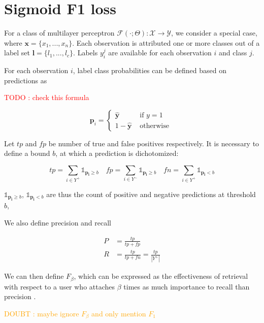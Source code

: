 \documentclass[sigconf,natbib,screen=true,review=true,anonymous]{acmart}
\newcommand\todo[1]{\textcolor{red}{TODO : #1}}
\newcommand\doubt[1]{\textcolor{orange}{DOUBT : #1}}
\begin{document}
\section{Sigmoid F1 loss}
\label{sec:orgcf3a92b}

For a class of multilayer perceptron \(\mathcal{F}(\cdot ; \Theta): \mathcal{X} \rightarrow \mathcal{Y}\), we consider a special case, where \(\mathbf{x} = \{x_1, ..., x_n\}\). Each observation is attributed one or more classes out of a label set \(\mathbf{l} = \{l_1, ..., l_c\}\). Labels \(y_{i}^{j}\) are available for each observation \(i\) and class \(j\). 

For each observation \(i\), label class probabilities can be defined based on predictions as

\todo{check this formula}

\begin{equation}
\mathbf{p}_{i}=\left\{\begin{array}{ll}\hat{\mathbf{y}} & \text { if } y=1 \\ 1-\hat{\mathbf{y}} & \text { otherwise }\end{array}\right.
\end{equation}

Let \(tp\) and \(fp\) be number of true and false positives respectively. It is necessary to define a bound \(b\), at which a prediction is dichotomized:

$$
 t p=\sum_{i \in Y^{+}} \mathds{1}_{\mathbf{p_i} \geq b} \quad f p=\sum_{i \in Y^{-}} \mathds{1}_{\mathbf{p_i} \geq b} \quad fn = \sum_{i \in Y^{+}} \mathds{1}_{\mathbf{p_i} < b}
 $$

\(\mathds{1}_{\mathbf{p_i} \geq b}\), \(\mathds{1}_{\mathbf{p_i} < b}\) are thus the count of positive and negative predictions at threshold \(b\), 

We also define precision and recall

\begin{equation}
\begin{aligned} P &=\frac{t p}{t p+f p} \\ R &=\frac{t p}{t p+f n}=\frac{t p}{\left|Y^{+}\right|} \end{aligned}
\end{equation}

We can then define \(F_\beta\), which can be expressed as the effectiveness of retrieval with respect to a user who attaches \(\beta\) times as much importance to recall than precision \cite{informationRetrieval}.

\doubt{maybe ignore $F_\beta$ and only mention $F_1$}
\end{document}
